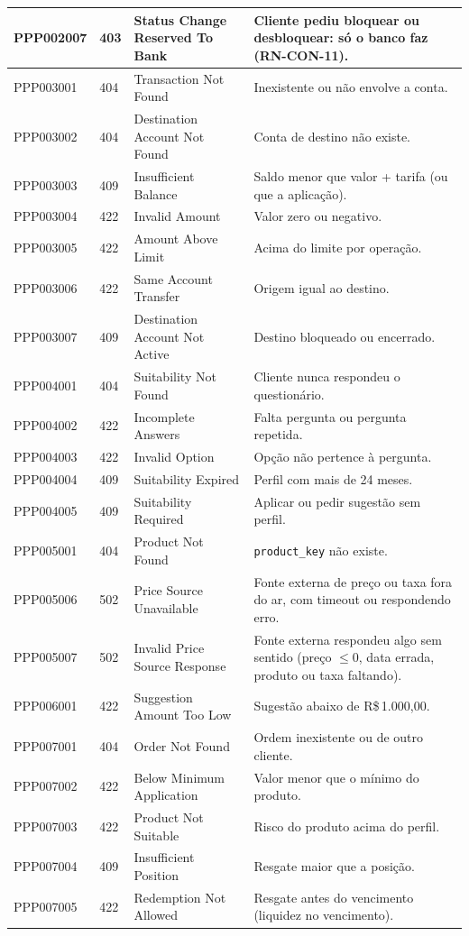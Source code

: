 \documentclass[11pt,a4paper]{article}
\newcommand{\rs}{R\$\,}
\newcommand{\tb}[1]{\texttt{#1}}           %
\begin{document}
\begin{longtable}{@{}P{1.9cm}P{1.1cm}P{4.3cm}P{8.0cm}@{}}
PPP002007 & 403 & Status Change Reserved To Bank & Cliente pediu bloquear ou desbloquear: só o banco faz (RN-CON-11). \\
\midrule
PPP003001 & 404 & Transaction Not Found & Inexistente ou não envolve a conta. \\
PPP003002 & 404 & Destination Account Not Found & Conta de destino não existe. \\
PPP003003 & 409 & Insufficient Balance & Saldo menor que valor + tarifa (ou que a aplicação). \\
PPP003004 & 422 & Invalid Amount & Valor zero ou negativo. \\
PPP003005 & 422 & Amount Above Limit & Acima do limite por operação. \\
PPP003006 & 422 & Same Account Transfer & Origem igual ao destino. \\
PPP003007 & 409 & Destination Account Not Active & Destino bloqueado ou encerrado. \\
\midrule
PPP004001 & 404 & Suitability Not Found & Cliente nunca respondeu o questionário. \\
PPP004002 & 422 & Incomplete Answers & Falta pergunta ou pergunta repetida. \\
PPP004003 & 422 & Invalid Option & Opção não pertence à pergunta. \\
PPP004004 & 409 & Suitability Expired & Perfil com mais de 24 meses. \\
PPP004005 & 409 & Suitability Required & Aplicar ou pedir sugestão sem perfil. \\
\midrule
PPP005001 & 404 & Product Not Found & \tb{product_key} não existe. \\
PPP005006 & 502 & Price Source Unavailable & Fonte externa de preço ou taxa fora do ar, com timeout ou respondendo erro. \\
PPP005007 & 502 & Invalid Price Source Response & Fonte externa respondeu algo sem sentido (preço $\le 0$, data errada, produto ou taxa faltando). \\
\midrule
PPP006001 & 422 & Suggestion Amount Too Low & Sugestão abaixo de \rs 1.000,00. \\
\midrule
PPP007001 & 404 & Order Not Found & Ordem inexistente ou de outro cliente. \\
PPP007002 & 422 & Below Minimum Application & Valor menor que o mínimo do produto. \\
PPP007003 & 422 & Product Not Suitable & Risco do produto acima do perfil. \\
PPP007004 & 409 & Insufficient Position & Resgate maior que a posição. \\
PPP007005 & 422 & Redemption Not Allowed & Resgate antes do vencimento (liquidez no vencimento). \\
\bottomrule
\end{longtable}
\endgroup
\end{document}
